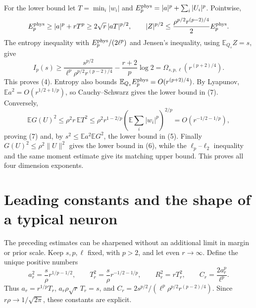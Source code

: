 \documentclass[11pt]{article}
\newcommand{\E}{\mathbb E}\newcommand{\Pp}{\mathbb P}
\begin{document}
For the lower bound let $T=\min_i|w_i|$ and
$E_p^{\rm phys}=|a|^p+\sum_i|U_i|^p$. Pointwise,
\[
 E_p^{\rm phys}\ge |a|^p+rT^p\ge2\sqrt r\,|aT|^{p/2},
 \qquad
 |Z|^{p/2}\le\frac{\rho^{p/2}r^{(p-2)/4}}2 E_p^{\rm phys}.
\]
The entropy inequality with $E_p^{\rm phys}/(2\ell^p)$ and Jensen's
inequality, using $\E_{Q_s}Z=s$, give
\[
 I_p(s)\ge
 \frac{s^{p/2}}{\ell^p\rho^{p/2}r^{(p-2)/4}}
       -\frac{r+2}{p}\log2
 =\Omega_{s,p,\ell}(r^{(p+2)/4}).
\]
This proves (4). Entropy also bounds
$\E_{Q_s}E_p^{\rm phys}=O(r^{(p+2)/4})$.
By Lyapunov, $\E a^2=O(r^{1/2+1/p})$, so Cauchy--Schwarz gives
the lower bound in (7). Conversely,
\[
 \E G(U)^2\le\rho^2 r\,\E T^2
 \le\rho^2 r^{1-2/p}
       (\E\textstyle\sum_i|w_i|^p)^{2/p}
 =O(r^{-1/2-1/p}),
\]
proving (7) and, by $s^2\le\E a^2\E G^2$, the lower bound in (5).
Finally $G(U)^2\le\rho^2\|U\|^2$ gives the lower bound in (6),
while the $\ell_p$--$\ell_2$ inequality and the same moment estimate
give its matching upper bound. This proves all four dimension exponents.

\section{Leading constants and the shape of a typical neuron}
The preceding estimates can be sharpened without an additional limit in
margin or prior scale. Keep $s,p,\ell$ fixed, with $p>2$, and let even
$r\to\infty$. Define the unique positive numbers
\[
 a_r^2=\frac{s}{\rho}r^{1/p-1/2},\qquad
 T_r^2=\frac{s}{\rho}r^{-1/2-1/p},\qquad
 R_r^2=rT_r^2,\qquad C_r=\frac{2a_r^p}{\ell^p}.
\]
Thus $a_r=r^{1/p}T_r$, $a_r\rho\sqrt r\,T_r=s$, and
$C_r=2s^{p/2}/(\ell^p\rho^{p/2}r^{(p-2)/4})$.
Since $r\rho\to1/\sqrt{2\pi}$, these constants are explicit.
\end{document}
